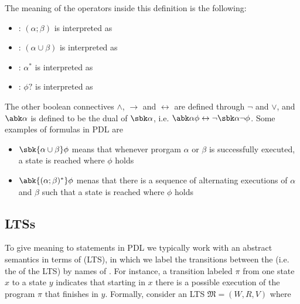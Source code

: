 \documentclass[a4paper, 12pt]{report}
\begin{document}
    The meaning of the operators inside this definition is the following:

    \begin{itemize}
        \item {}: $(\alpha ; \beta)$ is interpreted as 
        \item {}: $(\alpha \cup \beta)$ is interpreted as 
        \item {}: $\alpha^*$ is interpreted as 
        \item {}: $\phi?$ is interpreted as 
    \end{itemize}

    The other boolean connectives $\land$, $\to$ and $\leftrightarrow$ are defined through $\lnot$ and $\lor$, and $\abk \alpha$ is defined to be the dual of $\sbk \alpha$, i.e. $\abk \alpha \phi \leftrightarrow \lnot \sbk \alpha \lnot \phi$. Some examples of formulas in PDL are

    \begin{itemize}
        \item $\sbk{\alpha \cup \beta}\phi$ means that whenever prorgam $\alpha$ or $\beta$ is successfully executed, a state is reached where $\phi$ holds
        \item $\abk{(\alpha ; \beta)^*}\phi$ menas that there is a sequence of alternating executions of $\alpha$ and $\beta$ such that a state is reached where $\phi$ holds
    \end{itemize}

    \subsection{LTSs}

    To give meaning to statements in PDL we typically work with an abstract semantics in terms of  (LTS), in which we label the transitions between the  (i.e. the  of the LTS) by names of . For instance, a transition labeled $\pi$ from one state $x$ to a state $y$ indicates that starting in $x$ there is a possible execution of the program $\pi$ that finishes in $y$. Formally, consider an LTS $\mathfrak M = (W, R, V)$ where
    
\end{document}
